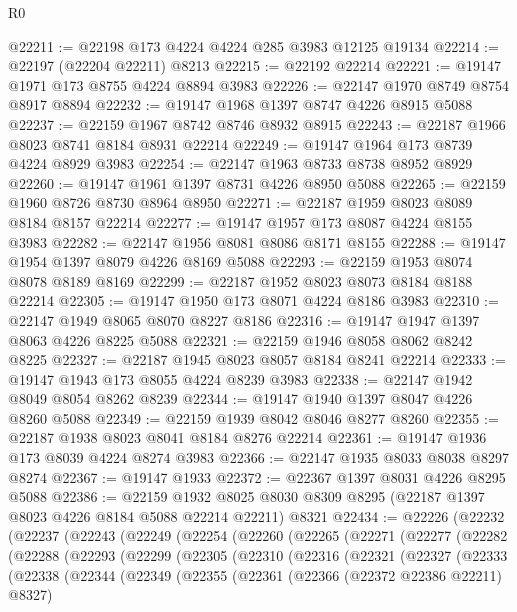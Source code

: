 \begin{lexlean}{R0}
\begin{coremodule}
@22211 := @22198 @173 @4224 @4224 @285 @3983 @12125 @19134
@22214 := @22197 (@22204 @22211) @8213
@22215 := @22192 @22214
@22221 := @19147 @1971 @173 @8755 @4224 @8894 @3983
@22226 := @22147 @1970 @8749 @8754 @8917 @8894
@22232 := @19147 @1968 @1397 @8747 @4226 @8915 @5088
@22237 := @22159 @1967 @8742 @8746 @8932 @8915
@22243 := @22187 @1966 @8023 @8741 @8184 @8931 @22214
@22249 := @19147 @1964 @173 @8739 @4224 @8929 @3983
@22254 := @22147 @1963 @8733 @8738 @8952 @8929
@22260 := @19147 @1961 @1397 @8731 @4226 @8950 @5088
@22265 := @22159 @1960 @8726 @8730 @8964 @8950
@22271 := @22187 @1959 @8023 @8089 @8184 @8157 @22214
@22277 := @19147 @1957 @173 @8087 @4224 @8155 @3983
@22282 := @22147 @1956 @8081 @8086 @8171 @8155
@22288 := @19147 @1954 @1397 @8079 @4226 @8169 @5088
@22293 := @22159 @1953 @8074 @8078 @8189 @8169
@22299 := @22187 @1952 @8023 @8073 @8184 @8188 @22214
@22305 := @19147 @1950 @173 @8071 @4224 @8186 @3983
@22310 := @22147 @1949 @8065 @8070 @8227 @8186
@22316 := @19147 @1947 @1397 @8063 @4226 @8225 @5088
@22321 := @22159 @1946 @8058 @8062 @8242 @8225
@22327 := @22187 @1945 @8023 @8057 @8184 @8241 @22214
@22333 := @19147 @1943 @173 @8055 @4224 @8239 @3983
@22338 := @22147 @1942 @8049 @8054 @8262 @8239
@22344 := @19147 @1940 @1397 @8047 @4226 @8260 @5088
@22349 := @22159 @1939 @8042 @8046 @8277 @8260
@22355 := @22187 @1938 @8023 @8041 @8184 @8276 @22214
@22361 := @19147 @1936 @173 @8039 @4224 @8274 @3983
@22366 := @22147 @1935 @8033 @8038 @8297 @8274
@22367 := @19147 @1933
@22372 := @22367 @1397 @8031 @4226 @8295 @5088
@22386 := @22159
    @1932
    @8025
    @8030
    @8309
    @8295
    (@22187 @1397 @8023 @4226 @8184 @5088 @22214 @22211)
    @8321
@22434 := @22226
    (@22232
      (@22237
        (@22243
          (@22249
            (@22254
              (@22260
                (@22265
                  (@22271
                    (@22277
                      (@22282
                        (@22288
                          (@22293
                            (@22299
                              (@22305
                                (@22310
                                  (@22316
                                    (@22321
                                      (@22327
                                        (@22333
                                          (@22338
                                            (@22344
                                              (@22349
                                                (@22355
                                                  (@22361
                                                    (@22366 (@22372 @22386 @22211) @8327)

\end{coremodule}
\end{lexlean}
